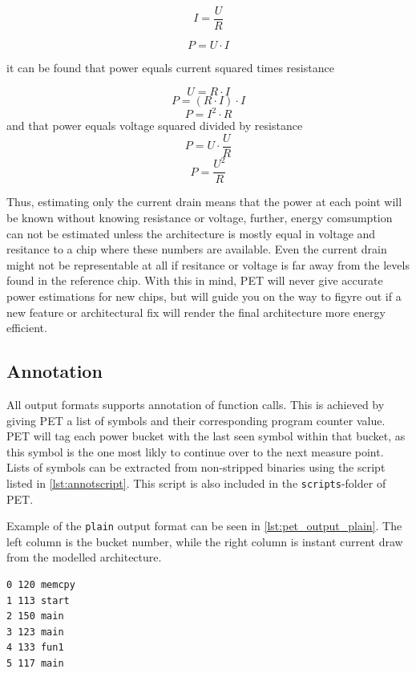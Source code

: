 \begin{equation}
I=\frac{U}{R}
\label{eq:ohm}
\end{equation}

\begin{equation}
P=U \cdot I
\label{eq:power}
\end{equation}

it can be found that power equals current squared times resistance

\[U=R \cdot I\]
\[P=(R \cdot I) \cdot I\]
\[P=I^2 \cdot R\]
and that power equals voltage squared divided by resistance
\[P=U \cdot \frac{U}{R}\]
\[P=\frac{U^2}{R}\]

Thus, estimating only the current drain means that the power at each point will
be known without knowing resistance or voltage, further, energy comsumption can
not be estimated unless the architecture is mostly equal in voltage and
resitance to a chip where these numbers are available. Even the current drain
might not be representable at all if resitance or voltage is far away from the
levels found in the reference chip. With this in mind, PET will never give
accurate power estimations for new chips, but will guide you on the way to
figyre out if a new feature or architectural fix will render the final
architecture more energy efficient.

\subsection{Annotation}

All output formats supports annotation of function calls. This is achieved by
giving PET a list of symbols and their corresponding program counter value. PET
will tag each power bucket with the last seen symbol within that bucket, as this
symbol is the one most likly to continue over to the next measure point. Lists
of symbols can be extracted from non-stripped binaries using the script listed
in \autoref{lst:annotscript}. This script is also included in the \texttt{scripts}-folder
of PET.



Example of the \texttt{plain} output format can be seen in
\autoref{lst:pet_output_plain}. The left column is the bucket number, while the
right column is instant current draw from the modelled architecture.

\begin{lstlisting}[float,label={lst:pet_output_plain},caption={PET Plain Output}]
0 120 memcpy
1 113 start
2 150 main
3 123 main
4 133 fun1
5 117 main
\end{lstlisting}

